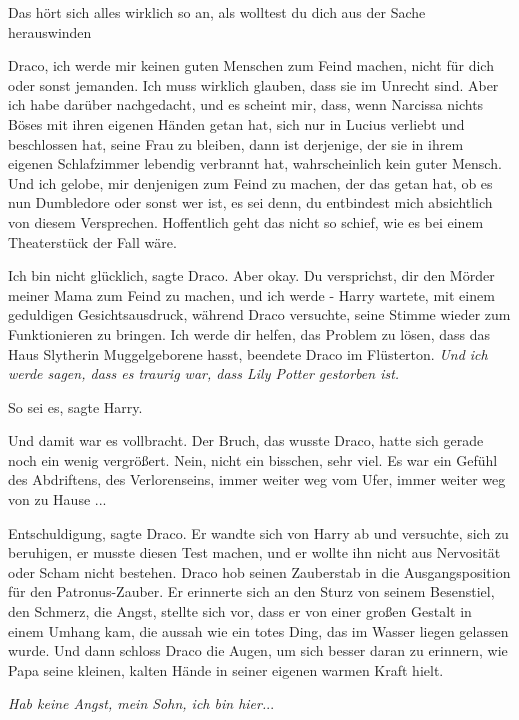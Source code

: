 \glqq{}Das hört sich alles wirklich so an, als wolltest du dich aus der Sache
herauswinden\grqq{}

\glqq{}Draco, ich werde mir keinen guten Menschen zum Feind machen, nicht für
dich oder sonst jemanden. Ich muss wirklich glauben, dass sie im Unrecht sind.
Aber ich habe darüber nachgedacht, und es scheint mir, dass, wenn Narcissa
nichts Böses mit ihren eigenen Händen getan hat, sich nur in Lucius verliebt und
beschlossen hat, seine Frau zu bleiben, dann ist derjenige, der sie in ihrem
eigenen Schlafzimmer lebendig verbrannt hat, wahrscheinlich kein guter Mensch.
Und ich gelobe, mir denjenigen zum Feind zu machen, der das getan hat, ob es nun
Dumbledore oder sonst wer ist, es sei denn, du entbindest mich absichtlich von
diesem Versprechen. Hoffentlich geht das nicht so schief, wie es bei einem
Theaterstück der Fall wäre.\grqq{}

\glqq{}Ich bin nicht glücklich\grqq{}, sagte Draco. \glqq{}Aber okay. Du
versprichst, dir den Mörder meiner Mama zum Feind zu machen, und ich werde
-\grqq{} Harry wartete, mit einem geduldigen Gesichtsausdruck, während Draco
versuchte, seine Stimme wieder zum Funktionieren zu bringen. \glqq{}Ich werde dir
helfen, das Problem zu lösen, dass das Haus Slytherin Muggelgeborene
hasst\grqq{}, beendete Draco im Flüsterton. \glqq{}\emph{Und ich werde sagen,
dass es traurig war, dass Lily Potter gestorben ist.}\grqq{}

\glqq{}So sei es\grqq{}, sagte Harry.

Und damit war es vollbracht. Der Bruch, das wusste Draco, hatte sich gerade noch
ein wenig vergrößert. Nein, nicht ein bisschen, sehr viel. Es war ein Gefühl des
Abdriftens, des Verlorenseins, immer weiter weg vom Ufer, immer weiter weg von
zu Hause ...

\glqq{}Entschuldigung\grqq{}, sagte Draco. Er wandte sich von Harry ab und
versuchte, sich zu beruhigen, er musste diesen Test machen, und er wollte ihn
nicht aus Nervosität oder Scham nicht bestehen. Draco hob seinen Zauberstab in
die Ausgangsposition für den Patronus-Zauber. Er erinnerte sich an den Sturz von
seinem Besenstiel, den Schmerz, die Angst, stellte sich vor, dass er von einer
großen Gestalt in einem Umhang kam, die aussah wie ein totes Ding, das im Wasser
liegen gelassen wurde. Und dann schloss Draco die Augen, um sich besser daran zu
erinnern, wie Papa seine kleinen, kalten Hände in seiner eigenen warmen Kraft
hielt.

\emph{Hab keine Angst, mein Sohn, ich bin hier.}..

